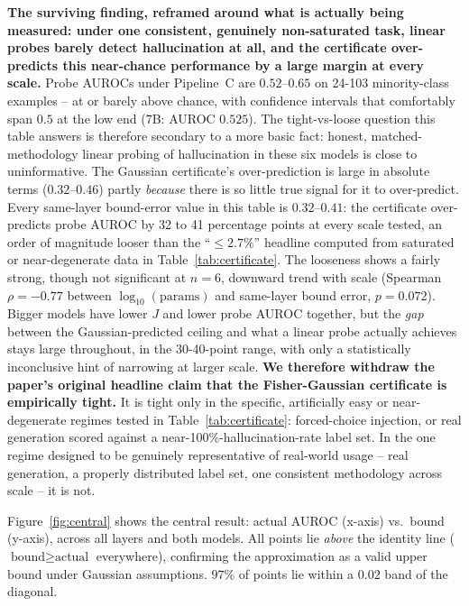 \documentclass[10pt,twocolumn]{article}
\begin{document}
\textbf{The surviving finding, reframed around what is actually being
measured: under one consistent, genuinely non-saturated task, linear
probes barely detect hallucination at all, and the certificate
over-predicts this near-chance performance by a large margin at every
scale.} Probe AUROCs under Pipeline~C are $0.52$--$0.65$ on 24-103
minority-class examples -- at or barely above chance, with confidence
intervals that comfortably span $0.5$ at the low end (7B: AUROC
$0.525$). The tight-vs-loose question this table answers is therefore
secondary to a more basic fact: honest, matched-methodology linear
probing of hallucination in these six models is close to uninformative.
The Gaussian certificate's over-prediction is large in absolute terms
($0.32$--$0.46$) partly \emph{because} there is so little true signal
for it to over-predict. Every same-layer bound-error value in this
table is $0.32$--$0.41$: the certificate over-predicts probe AUROC by 32
to 41 percentage points at every scale tested, an order of magnitude
looser than the ``$\leq 2.7\%$'' headline computed from saturated or
near-degenerate data in Table~\ref{tab:certificate}. The looseness shows
a fairly strong, though not significant at $n=6$, downward trend with
scale (Spearman $\rho = -0.77$ between $\log_{10}(\text{params})$ and
same-layer bound error, $p = 0.072$). Bigger models have lower $J$ and
lower probe AUROC together, but the \emph{gap} between the
Gaussian-predicted ceiling and what a linear probe actually achieves
stays large throughout, in the 30-40-point range, with only a
statistically inconclusive hint of narrowing at larger scale.
\textbf{We therefore withdraw the paper's original headline claim that
the Fisher-Gaussian certificate is empirically tight.} It is tight only
in the specific, artificially easy or near-degenerate regimes tested in
Table~\ref{tab:certificate}: forced-choice injection, or real
generation scored against a near-100\%-hallucination-rate label set. In
the one regime designed to be genuinely representative of real-world
usage -- real generation, a properly distributed label set, one
consistent methodology across scale -- it is not.

Figure~\ref{fig:central} shows the central result: actual AUROC
(x-axis) vs.\ bound (y-axis), across all layers and both models. All
points lie \emph{above} the identity line ($\text{bound} \geq
\text{actual}$ everywhere), confirming the approximation as a valid
upper bound under Gaussian assumptions. $97\%$ of points lie within a
$0.02$ band of the diagonal.
\end{document}
